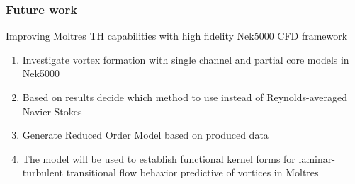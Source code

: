\begin{frame}
  \frametitle{Future work}       
              \begin{block}{Improving Moltres TH capabilities with high fidelity Nek5000 CFD framework \cite{obabko_verification_2015}}
               \begin{enumerate}
                \item Investigate vortex formation with single channel and partial core models in Nek5000
                \item Based on results decide which method to use instead of Reynolds-averaged Navier-Stokes
                \item Generate Reduced Order Model based on produced data
                \item The model will be used to establish functional kernel forms for laminar-turbulent transitional flow behavior predictive of vortices in Moltres
               \end{enumerate}
               \end{block}
\end{frame}